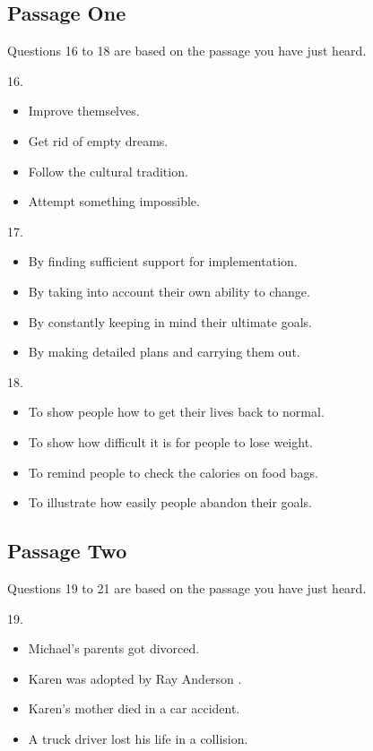 \documentclass[UTF8,11pt]{ctexart}
\begin{document}
\subsection*{\textbf{Passage One}}


Questions 16 to 18 are based on the passage you have just heard.


16.


\begin{itemize}[leftmargin=2em,itemsep=.2em,topsep=.4em]\item[A.] Improve themselves.
\item[B.] Get rid of empty dreams.
\item[C.] Follow the cultural tradition.
\item[D.] Attempt something impossible.
\end{itemize}

17.


\begin{itemize}[leftmargin=2em,itemsep=.2em,topsep=.4em]\item[A.] By finding sufficient support for implementation.
\item[B.] By taking into account their own ability to change.
\item[C.] By constantly keeping in mind their ultimate goals.
\item[D.] By making detailed plans and carrying them out.
\end{itemize}

18.


\begin{itemize}[leftmargin=2em,itemsep=.2em,topsep=.4em]\item[A.] To show people how to get their lives back to normal.
\item[B.] To show how difficult it is for people to lose weight.
\item[C.] To remind people to check the calories on food bags.
\item[D.] To illustrate how easily people abandon their goals.
\end{itemize}

\subsection*{\textbf{Passage Two}}


Questions 19 to 21 are based on the passage you have just heard.


19.


\begin{itemize}[leftmargin=2em,itemsep=.2em,topsep=.4em]\item[A.] Michael’s parents got divorced.
\item[B.] Karen was adopted by Ray Anderson .
\item[C.] Karen’s mother died in a car accident.
\item[D.] A truck driver lost his life in a collision.
\end{itemize}
\end{document}

